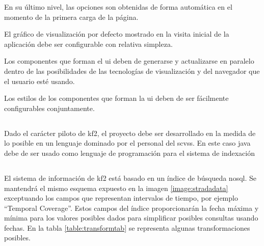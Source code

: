 En su último nivel, las opciones son obtenidas de forma automática en el momento de la primera carga de la página.

El gráfico de visualización por defecto mostrado en la visita inicial de la aplicación debe ser configurable con relativa simpleza.

Los componentes que forman el \gls{ui} deben de generarse y actualizarse en paralelo dentro de las posibilidades de las tecnologías de visualización y del navegador que el usuario esté usando.

Los estilos de los componentes que forman la \gls{ui} deben de ser fácilmente configurables conjuntamente.

\subsection{}
Dado el carácter piloto de \gls{kf2}, el proyecto debe ser desarrollado en la medida de lo posible en un lenguaje dominado por el personal del \gls{scvss}. En este caso \gls{java} debe de ser usado como lenguaje de programación para el sistema de indexación
 
\subsection{}



El sistema de información de \gls{kf2} está basado en un índice de búsqueda \gls{nosql}. Se mantendrá el mismo esquema expuesto en la imagen \ref{image:stradadata} exceptuando los campos que representan intervalos de tiempo, por ejemplo ``Temporal Coverage''.  Estos campos del índice proporcionarán la fecha máxima y mínima para los valores posibles dados para simplificar posibles consultas usando fechas. En la tabla \ref{table:transformtab} se representa algunas transformaciones posibles.

